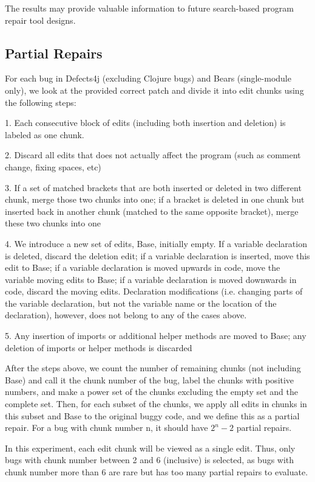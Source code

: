 \documentclass[sigconf, timestamp-false, anonymous=true]{acmart}
\begin{document}
The results may provide valuable information to future search-based program 
repair tool designs.

\subsection{Partial Repairs}

For each bug in Defects4j (excluding Clojure bugs) and Bears (single-module only), 
we look at the provided correct patch and divide it 
into edit chunks using the following steps:

1. Each consecutive block of edits (including both insertion and deletion) 
is labeled as one chunk.

2. Discard all edits that does not actually affect the program 
(such as comment change, fixing spaces, etc)

3. If a set of matched brackets that are both inserted or deleted in two different 
chunk, merge those two chunks into one; if a bracket is deleted in one chunk but 
inserted back in another chunk (matched to the same opposite bracket), merge these 
two chunks into one

4. We introduce a new set of edits, Base, initially empty. If a variable declaration 
is deleted, discard the deletion edit; if a variable declaration is inserted, move this
 edit to Base; if a variable declaration is moved upwards in code, move the variable 
moving edits to Base; if a variable declaration is moved downwards in code, 
discard the moving edits. Declaration modifications (i.e. changing parts of the 
variable declaration, but not the variable name or the location of the declaration), 
however, does not belong to any of the cases above.

5. Any insertion of imports or additional helper methods are moved to Base; 
any deletion of imports or helper methods is discarded

After the steps above, we count the number of remaining chunks (not including Base) 
and call it the chunk number of the bug, label the chunks with positive numbers, and 
make a power set of the chunks excluding the empty set and the complete set. 
Then, for each subset of the chunks, we apply all edits in chunks in this subset 
and Base to the original buggy code, and we define this as a partial repair. 
For a bug with chunk number n, it should have $2^n-2$ partial repairs. 

In this experiment, each edit chunk will be viewed as a single edit. Thus, only bugs 
with chunk number between 2 and 6 (inclusive) is selected, as bugs with chunk number 
more than 6 are rare but has too many partial repairs to evaluate.
\end{document}
